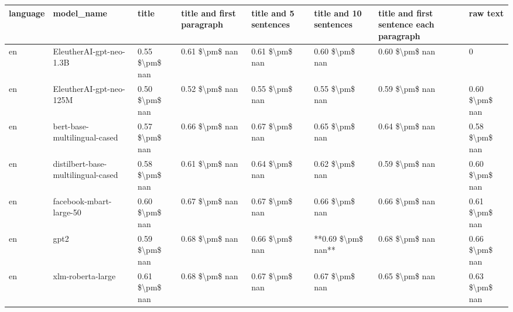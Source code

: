 \begin{tabular}{llllllll}
\toprule
language &                         model\_name &          title & title and first paragraph & title and 5 sentences & title and 10 sentences & title and first sentence each paragraph &           raw text \\
\midrule
      en &            EleutherAI-gpt-neo-1.3B & 0.55 \$\textbackslash pm\$ nan &            0.61 \$\textbackslash pm\$ nan &        0.61 \$\textbackslash pm\$ nan &         0.60 \$\textbackslash pm\$ nan &                          0.60 \$\textbackslash pm\$ nan &                  0 \\
      en &            EleutherAI-gpt-neo-125M & 0.50 \$\textbackslash pm\$ nan &            0.52 \$\textbackslash pm\$ nan &        0.55 \$\textbackslash pm\$ nan &         0.55 \$\textbackslash pm\$ nan &                          0.59 \$\textbackslash pm\$ nan &     0.60 \$\textbackslash pm\$ nan \\
      en &       bert-base-multilingual-cased & 0.57 \$\textbackslash pm\$ nan &            0.66 \$\textbackslash pm\$ nan &        0.67 \$\textbackslash pm\$ nan &         0.65 \$\textbackslash pm\$ nan &                          0.64 \$\textbackslash pm\$ nan &     0.58 \$\textbackslash pm\$ nan \\
      en & distilbert-base-multilingual-cased & 0.58 \$\textbackslash pm\$ nan &            0.61 \$\textbackslash pm\$ nan &        0.64 \$\textbackslash pm\$ nan &         0.62 \$\textbackslash pm\$ nan &                          0.59 \$\textbackslash pm\$ nan &     0.60 \$\textbackslash pm\$ nan \\
      en &            facebook-mbart-large-50 & 0.60 \$\textbackslash pm\$ nan &            0.67 \$\textbackslash pm\$ nan &        0.67 \$\textbackslash pm\$ nan &         0.66 \$\textbackslash pm\$ nan &                          0.66 \$\textbackslash pm\$ nan &     0.61 \$\textbackslash pm\$ nan \\
      en &                               gpt2 & 0.59 \$\textbackslash pm\$ nan &            0.68 \$\textbackslash pm\$ nan &        0.66 \$\textbackslash pm\$ nan &     **0.69 \$\textbackslash pm\$ nan** &                          0.68 \$\textbackslash pm\$ nan &     0.66 \$\textbackslash pm\$ nan \\
      en &                  xlm-roberta-large & 0.61 \$\textbackslash pm\$ nan &            0.68 \$\textbackslash pm\$ nan &        0.67 \$\textbackslash pm\$ nan &         0.67 \$\textbackslash pm\$ nan &                          0.65 \$\textbackslash pm\$ nan &     0.63 \$\textbackslash pm\$ nan \\

\end{tabular}
